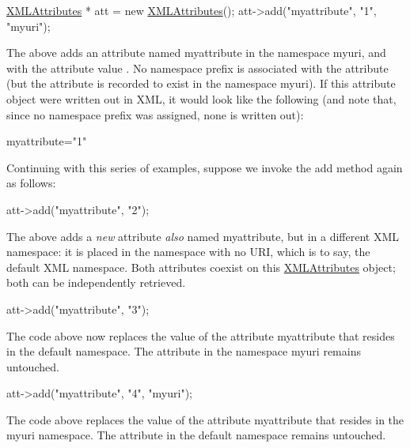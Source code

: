 \begin{DoxyCode}
\hyperlink{class_x_m_l_attributes}{XMLAttributes} * att = \textcolor{keyword}{new} \hyperlink{class_x_m_l_attributes}{XMLAttributes}();
att->add(\textcolor{stringliteral}{"myattribute"}, \textcolor{stringliteral}{"1"}, \textcolor{stringliteral}{"myuri"});
\end{DoxyCode}
 The above adds an attribute named {\ttfamily myattribute} in the namespace {\ttfamily myuri}, and with the attribute value {}. No namespace prefix is associated with the attribute (but the attribute is recorded to exist in the namespace {\ttfamily myuri}). If this attribute object were written out in X\+ML, it would look like the following (and note that, since no namespace prefix was assigned, none is written out)\+: \begin{center}
\begin{DoxyPre}
myattribute="1"
   \end{DoxyPre}
\end{center} 

Continuing with this series of examples, suppose we invoke the {\ttfamily add} method again as follows\+:


\begin{DoxyCode}
att->add(\textcolor{stringliteral}{"myattribute"}, \textcolor{stringliteral}{"2"});
\end{DoxyCode}
 The above adds a {\itshape new} attribute {\itshape also} named {\ttfamily myattribute}, but in a different X\+ML namespace\+: it is placed in the namespace with no U\+RI, which is to say, the default X\+ML namespace. Both attributes coexist on this \hyperlink{class_x_m_l_attributes}{X\+M\+L\+Attributes} object; both can be independently retrieved.


\begin{DoxyCode}
att->add(\textcolor{stringliteral}{"myattribute"}, \textcolor{stringliteral}{"3"});
\end{DoxyCode}
 The code above now replaces the value of the attribute {\ttfamily myattribute} that resides in the default namespace. The attribute in the namespace {\ttfamily myuri} remains untouched.


\begin{DoxyCode}
att->add(\textcolor{stringliteral}{"myattribute"}, \textcolor{stringliteral}{"4"}, \textcolor{stringliteral}{"myuri"});
\end{DoxyCode}
 The code above replaces the value of the attribute {\ttfamily myattribute} that resides in the {\ttfamily myuri} namespace. The attribute in the default namespace remains untouched.


